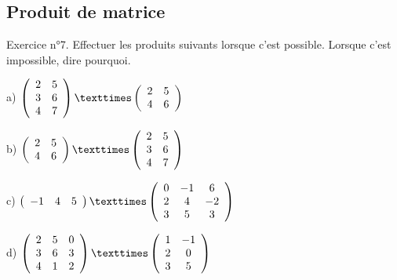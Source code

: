 \newpage
\subsection{Produit de matrice}
Exercice n°7.
Effectuer les produits suivants lorsque c’est possible. Lorsque c’est impossible, dire pourquoi.

\begin{minipage}[c]{.45\linewidth}
a)
$\left( \begin{array}{ c c }
 2 & 5 \\ 3 & 6 \\ 4 & 7
\end{array} \right)
×
\left( \begin{array}{ c c }
 2 & 5 \\ 4 & 6
\end{array} \right)$
\end{minipage}
\hfill
\begin{minipage}[c]{.45\linewidth}
b)
$\left( \begin{array}{ c c }
 2 & 5 \\ 4 & 6
\end{array} \right)
×
\left( \begin{array}{ c c }
 2 & 5 \\ 3 & 6 \\ 4 & 7
\end{array} \right)$
\end{minipage}

\begin{minipage}[c]{.45\linewidth}
c)
$\left( \begin{array}{ c c c }
 -1 & 4 & 5
\end{array} \right)
×
\left( \begin{array}{ c c c }
 0 & -1 & 6 \\ 2 & 4 & -2 \\ 3 & 5 & 3
\end{array} \right)$
\end{minipage}
\hfill
\begin{minipage}[c]{.45\linewidth}
d)
$\left( \begin{array}{ c c c }
 2 & 5 & 0 \\ 3 & 6 & 3 \\ 4 & 1 & 2
\end{array} \right)
×
\left( \begin{array}{ c c }
 1 & -1 \\ 2 & 0 \\ 3 & 5
\end{array} \right)$
\end{minipage}

